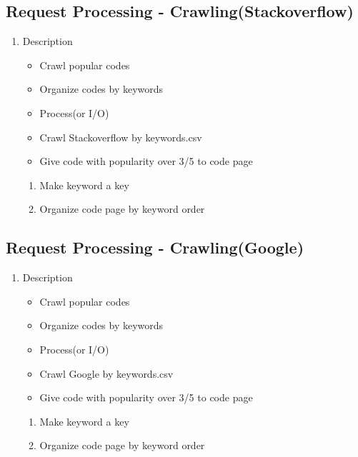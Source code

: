 \documentclass[conference]{IEEEtran}
\begin{document}
\subsection{Request Processing - Crawling(Stackoverflow)}
\begin{enumerate}
\item Description
\begin{itemize}
  \item Crawl popular codes
  \item Organize codes by keywords
  \item Process(or I/O) 
  \item Crawl Stackoverflow by keywords.csv
  \item Give code with popularity over 3/5 to code page
\end{itemize}
\begin{enumerate}
     \item Make keyword a key 
     \item Organize code page by keyword order
  \end{enumerate}
\end{enumerate}
\textit{}

\subsection{Request Processing - Crawling(Google)}
\begin{enumerate}
\item Description

\begin{itemize} 
  \item Crawl popular codes
  \item Organize codes by keywords
  \item Process(or I/O)
  \item Crawl Google by keywords.csv
  \item Give code with popularity over 3/5 to code page
\end{itemize}
  \begin{enumerate}
     \item Make keyword a key 
     \item Organize code page by keyword order
  \end{enumerate}
\end{enumerate}
\textit{}
\end{document}
